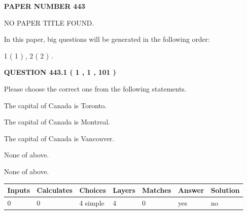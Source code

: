 \documentclass[12pt]{article}
\begin{document}
   
   
   
\newpage 
\setcounter{page}{ 
   443001 } 
   
   
   
   
 {\textbf{ \Large{ PAPER NUMBER  443  }}}
   
   
\vspace{0.2in}
   
   
   
   
   
   
 NO PAPER TITLE FOUND.
   
   
   
\vspace{0.2in}
   
In this paper, big questions will be generated in the following order: 
   
   
   1 ( 1 )
 ,
   2 ( 2 )
 .
  
\vspace{0.2in}
  
{\textbf{\Large{QUESTION
443.1 
 ( 1 , 1 , 101 )
}}}
  
  
Please choose the correct one from the following statements.
 
 
The capital of Canada is Toronto.
 
 
The capital of Canada is Montreal.
 
 
The capital of Canada is Vancouver.
 
 
 None of above.
 
 
\noindent{}
 
 
 None of above.
 
 
\noindent{}
 
 
   
   
   
   
\noindent\begin{tabular}{|l|l|l|l|l|l|l|}
 \hline
Inputs & Calculates & Choices & Layers & Matches & Answer & Solution \\ \hline
 0  & 
 0  & 
 4
  simple  
  & 
 4  & 
 0  & 
  yes & 
  no 
  \\ \hline
 \end{tabular}
   
\end{document}
